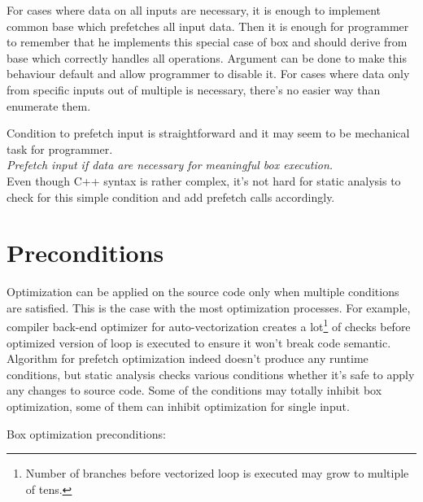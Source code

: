 For cases where data on all inputs are necessary, it is enough to implement common base which prefetches all input data. Then it is enough for programmer to remember that he implements this special case of box and should derive from base which correctly handles all operations. Argument can be done to make this behaviour default and allow programmer to disable it. For cases where data only from specific inputs out of multiple is necessary, there's no easier way than enumerate them.

Condition to prefetch input is straightforward and it may seem to be mechanical task for programmer.\\

\emph{Prefetch input if data are necessary for meaningful box execution.}
\\

Even though C++ syntax is rather complex, it's not hard for static analysis to check for this simple condition and add prefetch calls accordingly.

\section{Preconditions}
\label{prefetch-preconditions}
Optimization can be applied on the source code only when multiple conditions are satisfied. This is the case with the most optimization processes. For example, compiler back-end optimizer for auto-vectorization creates a lot\footnote{Number of branches before vectorized loop is executed may grow to multiple of tens.} of checks before optimized version of loop is executed to ensure it won't break code semantic. Algorithm for prefetch optimization indeed doesn't produce any runtime conditions, but static analysis checks various conditions whether it's safe to apply any changes to source code. Some of the conditions may totally inhibit box optimization, some of them can inhibit optimization for single input.

Box optimization preconditions:

